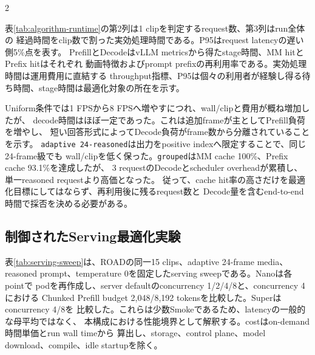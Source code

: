 \documentclass[9pt,a4paper]{extarticle}
\begin{document}
\begin{multicols}{2}

表\ref{tab:algorithm-runtime}の第2列は1 clipを判定するrequest数、第3列はrun全体の
経過時間をclip数で割った実効処理時間である。P95はrequest latencyの遅い側5\%点を表す。
PrefillとDecodeはvLLM metricsから得たstage時間、MM hitとPrefix hitはそれぞれ
動画特徴およびprompt prefixの再利用率である。実効処理時間は運用費用に直結する
throughput指標、P95は個々の利用者が経験し得る待ち時間、stage時間は最適化対象の所在を示す。

Uniform条件では1 FPSから8 FPSへ増やすにつれ、wall/clipと費用が概ね増加したが、
decode時間はほぼ一定であった。これは追加frameが主としてPrefill負荷を増やし、
短い回答形式によってDecode負荷がframe数から分離されていることを示す。
\texttt{adaptive 24-reasoned}は出力をpositive indexへ限定することで、同じ24-frame級でも
wall/clipを低く保った。\texttt{grouped}はMM cache 100\%、Prefix cache 93.1\%を達成したが、
3 requestのDecodeとscheduler overheadが累積し、単一reasoned requestより高価となった。
従って、cache hit率の高さだけを最適化目標にしてはならず、再利用後に残るrequest数と
Decode量を含むend-to-end時間で採否を決める必要がある。

\subsection{制御されたServing最適化実験}
表\ref{tab:serving-sweep}は、ROADの同一15 clips、adaptive 24-frame media、
reasoned prompt、temperature 0を固定したserving sweepである。Nanoは各pointで
podを再作成し、server defaultのconcurrency 1/2/4/8と、concurrency 4における
Chunked Prefill budget 2,048/8,192 tokensを比較した。Superはconcurrency 4/8を
比較した。これらは少数Smokeであるため、latencyの一般的な母平均ではなく、
本構成における性能境界として解釈する。costはon-demand時間単価とrun wall timeから
算出し、storage、control plane、model download、compile、idle startupを除く。
\end{multicols}
\end{document}
